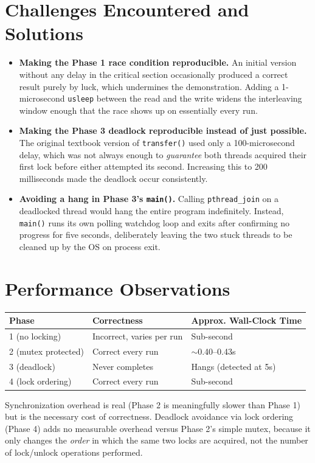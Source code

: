 \documentclass[11pt]{article}
\begin{document}
\section{Challenges Encountered and Solutions}
\begin{itemize}
  \item \textbf{Making the Phase 1 race condition reproducible.} An initial
        version without any delay in the critical section occasionally produced
        a correct result purely by luck, which undermines the demonstration.
        Adding a 1-microsecond \texttt{usleep} between the read and the write
        widens the interleaving window enough that the race shows up on
        essentially every run.
  \item \textbf{Making the Phase 3 deadlock reproducible instead of just
        possible.} The original textbook version of \texttt{transfer()} used
        only a 100-microsecond delay, which was not always enough to
        \emph{guarantee} both threads acquired their first lock before either
        attempted its second. Increasing this to 200 milliseconds made the
        deadlock occur consistently.
  \item \textbf{Avoiding a hang in Phase 3's \texttt{main()}.} Calling
        \texttt{pthread\_join} on a deadlocked thread would hang the entire
        program indefinitely. Instead, \texttt{main()} runs its own polling
        watchdog loop and exits after confirming no progress for five seconds,
        deliberately leaving the two stuck threads to be cleaned up by the OS
        on process exit.
\end{itemize}

\section{Performance Observations}
\begin{center}
\begin{tabular}{lll}
\toprule
Phase & Correctness & Approx. Wall-Clock Time \\
\midrule
1 (no locking)      & Incorrect, varies per run & Sub-second \\
2 (mutex protected) & Correct every run         & $\sim$0.40--0.43s \\
3 (deadlock)        & Never completes           & Hangs (detected at 5s) \\
4 (lock ordering)   & Correct every run         & Sub-second \\
\bottomrule
\end{tabular}
\end{center}
Synchronization overhead is real (Phase 2 is meaningfully slower than Phase 1)
but is the necessary cost of correctness. Deadlock avoidance via lock ordering
(Phase 4) adds no measurable overhead versus Phase 2's simple mutex, because it
only changes the \emph{order} in which the same two locks are acquired, not the
number of lock/unlock operations performed.
\end{document}
